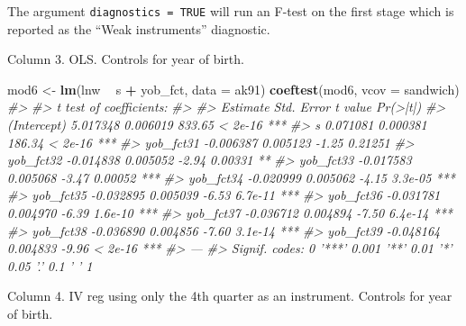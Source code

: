 \documentclass[]{book}
\newenvironment{Shaded}{\begin{snugshade}}{\end{snugshade}}
\newcommand{\CommentTok}[1]{\textcolor[rgb]{0.56,0.35,0.01}{\textit{#1}}}
\newcommand{\DataTypeTok}[1]{\textcolor[rgb]{0.13,0.29,0.53}{#1}}
\newcommand{\KeywordTok}[1]{\textcolor[rgb]{0.13,0.29,0.53}{\textbf{#1}}}
\newcommand{\NormalTok}[1]{#1}
\newcommand{\OperatorTok}[1]{\textcolor[rgb]{0.81,0.36,0.00}{\textbf{#1}}}
\newcommand{\StringTok}[1]{\textcolor[rgb]{0.31,0.60,0.02}{#1}}
\theoremstyle{definition}
\theoremstyle{definition}
\theoremstyle{definition}
\theoremstyle{remark}
\begin{document}
The argument \texttt{diagnostics\ =\ TRUE} will run an F-test on the
first stage which is reported as the ``Weak instruments'' diagnostic.

Column 3. OLS. Controls for year of birth.

\begin{Shaded}
\begin{Highlighting}[]
\NormalTok{mod6 <-}\StringTok{ }\KeywordTok{lm}\NormalTok{(lnw }\OperatorTok{~}\StringTok{ }\NormalTok{s }\OperatorTok{+}\StringTok{ }\NormalTok{yob_fct, }\DataTypeTok{data =}\NormalTok{ ak91)}
\KeywordTok{coeftest}\NormalTok{(mod6, }\DataTypeTok{vcov =}\NormalTok{ sandwich)}
\CommentTok{#> }
\CommentTok{#> t test of coefficients:}
\CommentTok{#> }
\CommentTok{#>              Estimate Std. Error t value Pr(>|t|)    }
\CommentTok{#> (Intercept)  5.017348   0.006019  833.65  < 2e-16 ***}
\CommentTok{#> s            0.071081   0.000381  186.34  < 2e-16 ***}
\CommentTok{#> yob_fct31   -0.006387   0.005123   -1.25  0.21251    }
\CommentTok{#> yob_fct32   -0.014838   0.005052   -2.94  0.00331 ** }
\CommentTok{#> yob_fct33   -0.017583   0.005068   -3.47  0.00052 ***}
\CommentTok{#> yob_fct34   -0.020999   0.005062   -4.15  3.3e-05 ***}
\CommentTok{#> yob_fct35   -0.032895   0.005039   -6.53  6.7e-11 ***}
\CommentTok{#> yob_fct36   -0.031781   0.004970   -6.39  1.6e-10 ***}
\CommentTok{#> yob_fct37   -0.036712   0.004894   -7.50  6.4e-14 ***}
\CommentTok{#> yob_fct38   -0.036890   0.004856   -7.60  3.1e-14 ***}
\CommentTok{#> yob_fct39   -0.048164   0.004833   -9.96  < 2e-16 ***}
\CommentTok{#> ---}
\CommentTok{#> Signif. codes:  0 '***' 0.001 '**' 0.01 '*' 0.05 '.' 0.1 ' ' 1}
\end{Highlighting}
\end{Shaded}

Column 4. IV reg using only the 4th quarter as an instrument. Controls
for year of birth.
\end{document}
